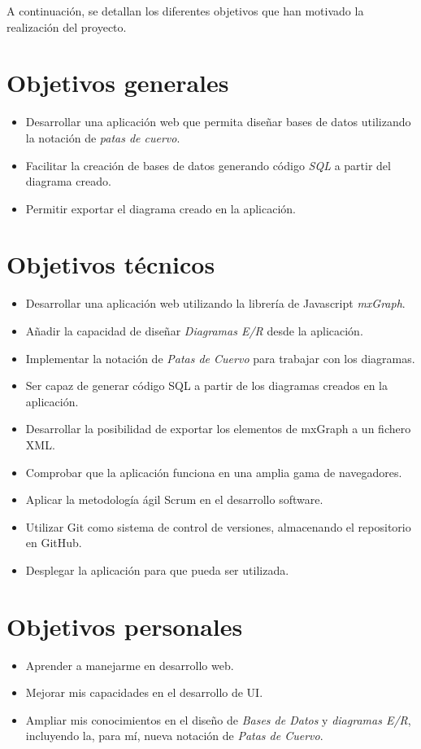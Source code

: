 
A continuación, se detallan los diferentes objetivos que han motivado la realización del proyecto.

\section{Objetivos generales}
\begin{itemize}
    \item Desarrollar una aplicación web que permita diseñar bases de datos utilizando la notación de \emph{patas de cuervo}.
    \item Facilitar la creación de bases de datos generando código \emph{SQL} a partir del diagrama creado.
    \item Permitir exportar el diagrama creado en la aplicación.
\end{itemize}

\section{Objetivos técnicos}
\begin{itemize}
    \item Desarrollar una aplicación web utilizando la librería de Javascript \emph{mxGraph}.
    \item Añadir la capacidad de diseñar \emph{Diagramas E/R} desde la aplicación.
    \item Implementar la notación de \emph{Patas de Cuervo} para trabajar con los diagramas.
    \item Ser capaz de generar código SQL a partir de los diagramas creados en la aplicación.
    \item Desarrollar la posibilidad de exportar los elementos de mxGraph a un fichero XML.
    \item Comprobar que la aplicación funciona en una amplia gama de navegadores.
    \item Aplicar la metodología ágil Scrum en el desarrollo software.
    \item Utilizar Git como sistema de control de versiones, almacenando el repositorio en GitHub.
    \item Desplegar la aplicación para que pueda ser utilizada.
\end{itemize}

\section{Objetivos personales}
\begin{itemize}
    \item Aprender a manejarme en desarrollo web.
    \item Mejorar mis capacidades en el desarrollo de UI.
    \item Ampliar mis conocimientos en el diseño de \emph{Bases de Datos} y \emph{diagramas E/R}, incluyendo la, para mí, nueva notación de \emph{Patas de Cuervo}.
\end{itemize}